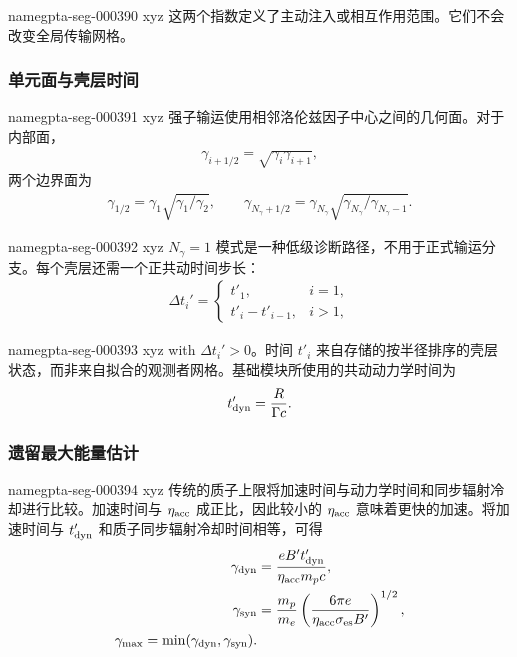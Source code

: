 \documentclass[twocolumn]{aastex702}
\makeatletter
\providecommand{\gptareaderanchor}[1]{\pdfdest name{#1} xyz}%
\providecommand{\gptareaderanchor}[1]{\special{pdf:dest (#1) [ @thispage /XYZ @xpos @ypos null ]}}%
\makeatother
\begin{document}
\gptareaderanchor{gpta-seg-000390}%
这两个指数定义了主动注入或相互作用范围。它们不会改变全局传输网格。

\subsubsection{单元面与壳层时间}


\gptareaderanchor{gpta-seg-000391}%
强子输运使用相邻洛伦兹因子中心之间的几何面。对于内部面，
\begin{equation}
\begin{aligned}
\gamma_{i+1/2}=\sqrt{\gamma_i\gamma_{i+1}},
\end{aligned}
\end{equation}
两个边界面为
\begin{equation}
\begin{aligned}
\gamma_{1/2}=\gamma_1\sqrt{\gamma_1/\gamma_2},\qquad
\gamma_{N_\gamma+1/2}=\gamma_{N_\gamma}
\sqrt{\gamma_{N_\gamma}/\gamma_{N_\gamma-1}}.
\end{aligned}
\end{equation}

\gptareaderanchor{gpta-seg-000392}%
\(N_\gamma=1\) 模式是一种低级诊断路径，不用于正式输运分支。每个壳层还需一个正共动时间步长：
\begin{equation}
\begin{aligned}
\Delta t_i' =
\begin{cases}
t'_1, & i=1,\\
t'_i-t'_{i-1}, & i>1,
\end{cases}
\end{aligned}
\end{equation}

\gptareaderanchor{gpta-seg-000393}%
with \(\Delta t_i'>0\)。时间 \(t'_i\) 来自存储的按半径排序的壳层状态，而非来自拟合的观测者网格。基础模块所使用的共动动力学时间为
\begin{equation}
\begin{aligned}
t'_{\rm dyn}=\frac{R}{\Gamma c}.
\end{aligned}
\end{equation}

\subsubsection{遗留最大能量估计}


\gptareaderanchor{gpta-seg-000394}%
传统的质子上限将加速时间与动力学时间和同步辐射冷却进行比较。加速时间与 \(\eta_{\rm acc}\) 成正比，因此较小的 \(\eta_{\rm acc}\) 意味着更快的加速。将加速时间与 \(t'_{\rm dyn}\) 和质子同步辐射冷却时间相等，可得
\begin{equation}
\begin{aligned}
\gamma_{\rm dyn}
&=\frac{eB't'_{\rm dyn}}{\eta_{\rm acc}m_pc},\\
\gamma_{\rm syn}
&=\frac{m_p}{m_e}
\left(\frac{6\pi e}{\eta_{\rm acc}\sigma_{\rm es}B'}\right)^{1/2},\\
\gamma_{\max}=\min(\gamma_{\rm dyn},\gamma_{\rm syn}) .
\end{aligned}
\end{equation}
\end{document}
